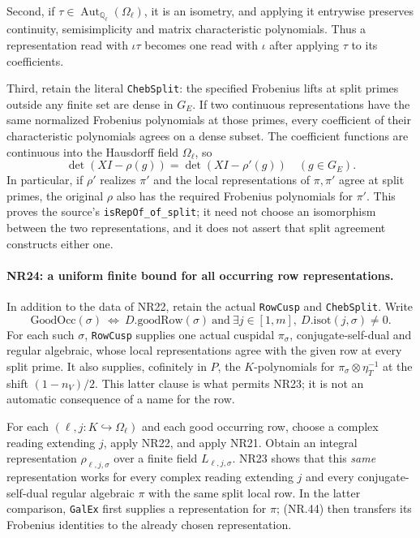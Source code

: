 Second, if $\tau\in\operatorname{Aut}_{\mathbb Q_\ell}(\Omega_\ell)$,
it is an isometry, and applying it entrywise preserves continuity,
semisimplicity and matrix characteristic polynomials. Thus a
representation read with $\iota\tau$ becomes one read with
$\iota$ after applying $\tau$ to its coefficients.

Third, retain the literal \texttt{ChebSplit}: the specified
Frobenius lifts at split primes outside any finite set are dense
in $G_E$. If two continuous representations have the same
normalized Frobenius polynomials at those primes, every
coefficient of their characteristic polynomials agrees on a
dense subset. The coefficient functions are continuous into
the Hausdorff field $\Omega_\ell$, so
\[
                \det(XI-\rho(g))=\det(XI-\rho'(g))
                                      \quad(g\in G_E).           \tag{NR.44}
\]
In particular, if $\rho'$ realizes $\pi'$ and the local
representations of $\pi,\pi'$ agree at split primes, the original
$\rho$ also has the required Frobenius polynomials for $\pi'$.
This proves the source's \texttt{isRepOf\_of\_split}; it need not
choose an isomorphism between the two representations, and it
does not assert that split agreement constructs either one.

\paragraph{NR24: a uniform finite bound for all occurring row representations.}
In addition to the data of NR22, retain the actual
\texttt{RowCusp} and \texttt{ChebSplit}. Write
\[
 \mathrm{GoodOcc}(\sigma)\ \Longleftrightarrow\
 D.\mathrm{goodRow}(\sigma)\ \text{and}\
 \exists j\in[1,m],\ D.\mathrm{isot}(j,\sigma)\ne0.
                                                               \tag{NR.45}
\]
For each such $\sigma$, \texttt{RowCusp} supplies one actual
cuspidal $\pi_\sigma$, conjugate-self-dual and regular algebraic,
whose local representations agree with the given row at every
split prime. It also supplies, cofinitely in $P$, the
$K$-polynomials for $\pi_\sigma\otimes\eta_T^{-1}$ at the shift
$(1-n_V)/2$. This latter clause is what permits NR23; it is not
an automatic consequence of a name for the row.

For each $(\ell,j:K\hookrightarrow\Omega_\ell)$ and each good
occurring row, choose a complex reading extending $j$, apply
NR22, and apply NR21. Obtain an integral representation
$\rho_{\ell,j,\sigma}$ over a finite field $L_{\ell,j,\sigma}$.
NR23 shows that this \emph{same} representation works for every
complex reading extending $j$ and every conjugate-self-dual
regular algebraic $\pi$ with the same split local row. In the
latter comparison, \texttt{GalEx} first supplies a representation
for $\pi$; (NR.44) then transfers its Frobenius identities to the
already chosen representation.

